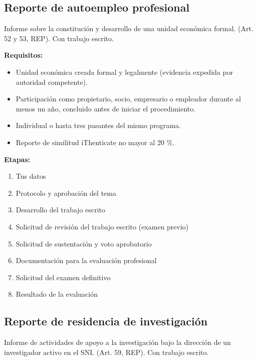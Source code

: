 \subsection{Reporte de autoempleo profesional}
Informe sobre la constitución y desarrollo de una unidad económica formal. (Art. 52 y 53, REP). Con trabajo escrito.

\textbf{Requisitos:}
\begin{itemize}
  \item Unidad económica creada formal y legalmente (evidencia expedida por autoridad competente).
  \item Participación como propietario, socio, empresario o empleador durante al menos un año, concluido antes de iniciar el procedimiento.
  \item Individual o hasta tres pasantes del mismo programa.
  \item Reporte de similitud iThenticate no mayor al 20 \%.
\end{itemize}
\textbf{Etapas:}
\begin{enumerate}
  \item Tus datos
  \item Protocolo y aprobación del tema
  \item Desarrollo del trabajo escrito
  \item Solicitud de revisión del trabajo escrito (examen previo)
  \item Solicitud de sustentación y voto aprobatorio
  \item Documentación para la evaluación profesional
  \item Solicitud del examen definitivo
  \item Resultado de la evaluación
\end{enumerate}
\subsection{Reporte de residencia de investigación}
Informe de actividades de apoyo a la investigación bajo la dirección de un investigador activo en el SNI. (Art. 59, REP). Con trabajo escrito.


